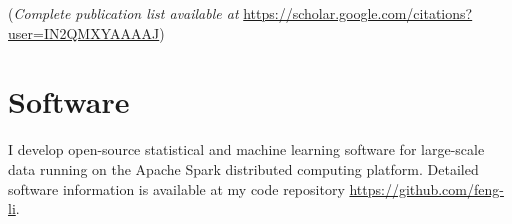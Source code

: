 \documentclass[twoside,a4paper]{article}
\begin{document}
(\emph{Complete publication list available at}
  \url{https://scholar.google.com/citations?user=IN2QMXYAAAAJ})

\begin{refsection}

\nocite{GaoY2024GridPoint}
\nocite{WangH2024CatastropheDuration}
\nocite{HuangY2024LocalInformation}
\nocite{RenY2023InfiniteForecast}
\nocite{ZhangG2023ProbabilisticForecast}
\nocite{LiF2024ForecasterReview}
\nocite{LiL2023ForecastingLarge}
\nocite{ZhangB2023OptimalReconciliation}
\nocite{LiL2023FeaturebasedIntermittent}
\nocite{WangX2023ForecastCombinations}
\nocite{PanR2022NoteDistributed}
\nocite{LiL2023BayesianForecast}
\nocite{WangZ2022EscalatorAccident}
\nocite{WangX2023DistributedARIMA}
\nocite{AndererM2022HierarchicalForecasting}
\nocite{JanewayMG2021ClinicalDiagnostic}
\nocite{PetropoulosF2022ForecastingTheory}
\nocite{KangY2022ForecastForecasts}
\nocite{TalagalaTS2022FFORMPPFeaturebased}
\nocite{ZhuX2021LeastSquareApproximation}
\nocite{WangX2022UncertaintyEstimation}
\nocite{KangY2021DejaVu}
\nocite{HaoC2020BilinearReduced}
\nocite{LiX2020ForecastingTime}
\nocite{KangY2020GRATISGeneRAting}
\nocite{kang2020statcompcn}
\nocite{kang2020fppcn}
\nocite{KalesanB2020IntersectionsFirearm}
\nocite{BaileyHM2019ChangesPatterns}
\nocite{LiF2019CreditRisk}
\nocite{LiF2018ImprovingForecasting}
\nocite{PinoEC2018CohortProfile}
\nocite{li2016distributedcn}
\nocite{LiF2013BayesianModeling}
\nocite{LiF2013EfficientBayesian}
\nocite{LiF2011ModellingConditional}
\nocite{LiF2010FlexibleModeling}

\printbibliography[heading=none]
\end{refsection}

\newpage
\section{Software}
I develop open-source statistical and machine learning software for large-scale data running on the Apache Spark distributed computing platform. Detailed software information is available at my code repository \url{https://github.com/feng-li}.
\end{document}

